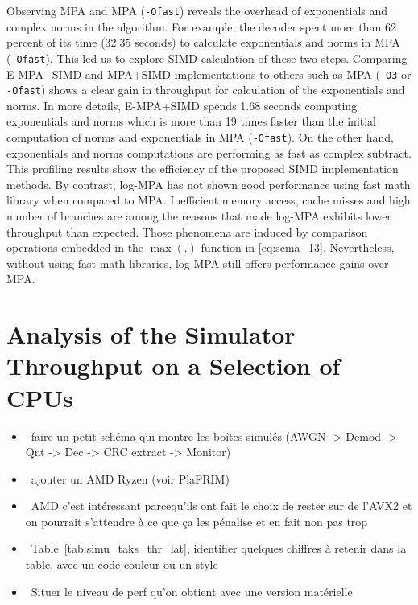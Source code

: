 Observing MPA and MPA (\verb|-Ofast|) reveals the overhead of exponentials and
complex norms in the algorithm. For example, the decoder spent more than 62
percent of its time (32.35 seconds) to calculate exponentials and norms in MPA
(\verb|-Ofast|). This led us to explore SIMD calculation of these two steps.
Comparing E-MPA+SIMD and MPA+SIMD implementations to others such as MPA
(\verb|-O3| or \verb|-Ofast|) shows a clear gain in throughput for calculation
of the exponentials and norms. In more details, E-MPA+SIMD spends 1.68 seconds
computing exponentials and norms which is more than 19 times faster than the
initial computation of norms and exponentials in MPA (\verb|-Ofast|). On the
other hand, exponentials and norms computations are performing as fast as
complex subtract. This profiling results show the efficiency of the proposed
SIMD implementation methods. By contrast, log-MPA has not shown good performance
using fast math library when compared to MPA. Inefficient memory access, cache
misses and high number of branches are among the reasons that made log-MPA
exhibits lower throughput than expected. Those phenomena are induced by
comparison operations embedded in the $\max(.)$ function in \eqref{eq:scma_13}.
Nevertheless, without using fast math libraries, log-MPA
still offers performance gains over MPA.

\section{Analysis of the Simulator Throughput on a Selection of CPUs}

\begin{itemize}
  \item \cmark~faire un petit schéma qui montre les boîtes simulés (AWGN -> Demod -> Qnt -> Dec -> CRC extract -> Monitor)
  \item \cmark~ajouter un AMD Ryzen (voir PlaFRIM)
  \item \xmark~AMD c'est intéressant parcequ'ils ont fait le choix de rester sur de l'AVX2 et on pourrait s'attendre à ce que ça les pénalise et en fait non pas trop
  \item \xmark~Table~\ref{tab:simu_taks_thr_lat}, identifier quelques chiffres à retenir dans la table, avec un code couleur ou un style
  \item \xmark~Situer le niveau de perf qu'on obtient avec une version matérielle
\end{itemize}

